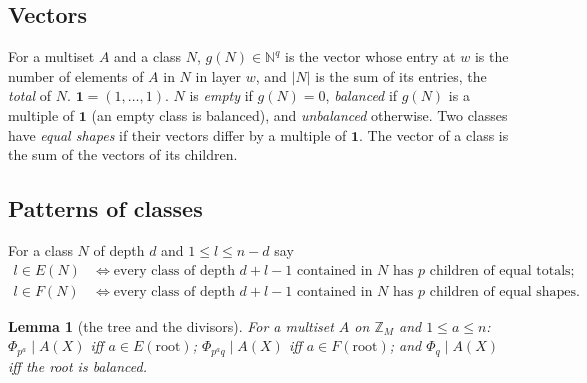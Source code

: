 \documentclass[11pt,a4paper]{amsart}
\newtheorem{lemma}[theorem]{Lemma}
\theoremstyle{definition}
\theoremstyle{remark}
\newcommand{\Z}{\mathbb{Z}}
\newcommand{\N}{\mathbb{N}}
\newcommand{\one}{\mathbf{1}}
\begin{document}
\subsection*{Vectors} For a multiset $A$ and a class $N$, $g(N)\in\N^q$ is the vector whose entry at $w$ is the
number of elements of $A$ in $N$ in layer $w$, and $|N|$ is the sum of its entries, the \emph{total} of $N$.
$\one=(1,\dots,1)$. $N$ is \emph{empty} if $g(N)=0$, \emph{balanced} if $g(N)$ is a multiple of $\one$ (an
empty class is balanced), and \emph{unbalanced} otherwise. Two classes have \emph{equal shapes} if their
vectors differ by a multiple of $\one$. The vector of a class is the sum of the vectors of its children.

\subsection*{Patterns of classes} For a class $N$ of depth $d$ and $1\le l\le n-d$ say
\begin{align*}
 l\in E(N)&\iff\text{every class of depth $d+l-1$ contained in $N$ has $p$ children of equal totals;}\\
 l\in F(N)&\iff\text{every class of depth $d+l-1$ contained in $N$ has $p$ children of equal shapes.}
\end{align*}

\begin{lemma}[the tree and the divisors]\label{lem:translate}
For a multiset $A$ on $\Z_M$ and $1\le a\le n$: $\Phi_{p^a}\mid A(X)$ iff $a\in E(\mathrm{root})$;
$\Phi_{p^aq}\mid A(X)$ iff $a\in F(\mathrm{root})$; and $\Phi_q\mid A(X)$ iff the root is balanced.
\end{lemma}
\end{document}

